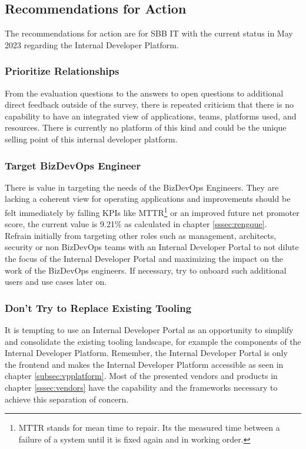 \documentclass[a4paper,12pt]{article}
\begin{document}
    \subsection{Recommendations for Action}
    \label{subsec:arec}
    The recommendations for action are for SBB IT with the current status in May 2023 regarding the Internal Developer Platform.

    \subsubsection{Prioritize Relationships}
    From the evaluation questions to the answers to open questions to additional direct feedback outside of the survey,
    there is repeated criticism that there is no capability to have an integrated view of applications, teams, platforms
    used, and resources.
    There is currently no platform of this kind and could be the unique selling point of this internal developer platform.

    \subsubsection{Target BizDevOps Engineer}
    There is value in targeting the needs of the BizDevOps Engineers.
    They are lacking a coherent view for operating applications and improvements should be felt immediately by falling
    KPIs like MTTR\footnote{MTTR stands for mean time to repair. Its the measured time between a failure of a system
    until it is fixed again and in working order.} or an improved future net promoter score, the current value is 9.21\%
    as calculated in chapter \ref{sssec:rengque}.\\
    Refrain initially from targeting other roles such as management, architects, security or non BizDevOps teams with
    an Internal Developer Portal to not dilute the focus of the Internal Developer Portal and maximizing the impact on
    the work of the BizDevOps engineers.
    If necessary, try to onboard such additional users and use cases later on.

    \subsubsection{Don't Try to Replace Existing Tooling}
    It is tempting to use an Internal Developer Portal as an opportunity to simplify and consolidate the existing tooling
    landscape, for example the components of the Internal Developer Platform.
    Remember, the Internal Developer Portal is only the frontend and makes the Internal Developer Platform accessible
    as seen in chapter \ref{subsec:vpplatform}.
    Most of the presented vendors and products in chapter \ref{sssec:vendors} have the capability and the frameworks
    necessary to achieve this separation of concern.
\end{document}
